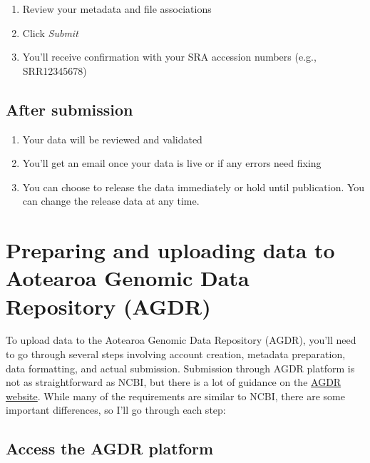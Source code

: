 \documentclass[
]{article}
\begin{document}
\begin{enumerate}
\def\labelenumi{\arabic{enumi}.}
\item
  Review your metadata and file associations
\item
  Click \emph{Submit}
\item
  You'll receive confirmation with your SRA accession numbers (e.g.,
  SRR12345678)
\end{enumerate}

\hypertarget{after-submission}{%
\subsection{After submission}\label{after-submission}}

\begin{enumerate}
\def\labelenumi{\arabic{enumi}.}
\item
  Your data will be reviewed and validated
\item
  You'll get an email once your data is live or if any errors need
  fixing
\item
  You can choose to release the data immediately or hold until
  publication. You can change the release data at any time.
\end{enumerate}

\hypertarget{preparing-and-uploading-data-to-aotearoa-genomic-data-repository-agdr}{%
\section{Preparing and uploading data to Aotearoa Genomic Data
Repository
(AGDR)}\label{preparing-and-uploading-data-to-aotearoa-genomic-data-repository-agdr}}

To upload data to the Aotearoa Genomic Data Repository (AGDR), you'll
need to go through several steps involving account creation, metadata
preparation, data formatting, and actual submission. Submission through
AGDR platform is not as straightforward as NCBI, but there is a lot of
guidance on the \href{https://data.agdr.org.nz/}{AGDR website}. While
many of the requirements are similar to NCBI, there are some important
differences, so I'll go through each step:

\hypertarget{access-the-agdr-platform}{%
\subsection{Access the AGDR platform}\label{access-the-agdr-platform}}
\end{document}
